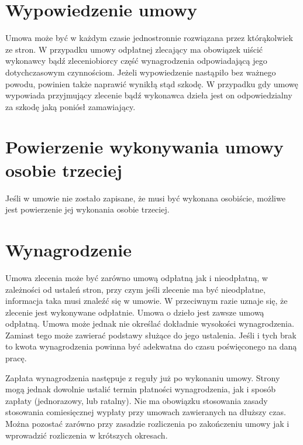 \section[Wypowiedzenie umowy][Wypowiedzenie umowy]{Wypowiedzenie umowy}
Umowa może być w każdym czasie jednostronnie rozwiązana przez którąkolwiek ze stron. W przypadku umowy odpłatnej zlecający ma obowiązek uiścić wykonawcy bądź zleceniobiorcy część wynagrodzenia odpowiadającą jego dotychczasowym czynnościom. Jeżeli wypowiedzenie nastąpiło bez ważnego powodu, powinien także naprawić wynikłą stąd szkodę. W przypadku gdy umowę wypowiada przyjmujący zlecenie bądź wykonawca dzieła jest on odpowiedzialny za szkodę jaką poniósł zamawiający.

\section[Powierzenie wykonywania umowy osobie trzeciej][Powierzenie wykonywania umowy osobie trzeciej]{Powierzenie wykonywania umowy osobie trzeciej}
Jeśli w umowie nie zostało zapisane, że musi być wykonana osobiście, możliwe jest powierzenie jej wykonania osobie trzeciej.

\section[Wynagrodzenie][Wynagrodzenie]{Wynagrodzenie}
Umowa zlecenia może być zarówno umową odpłatną jak i nieodpłatną, w zależności od ustaleń stron, przy czym jeśli zlecenie ma być nieodpłatne, informacja taka musi znaleźć się w umowie. W przeciwnym razie uznaje się, że zlecenie jest wykonywane odpłatnie. Umowa o dzieło jest zawsze umową odpłatną. Umowa może jednak nie określać dokładnie wysokości wynagrodzenia. Zamiast tego może zawierać podstawy służące do jego ustalenia. Jeśli i tych brak to kwota wynagrodzenia powinna być adekwatna do czasu poświęconego na daną pracę.

Zapłata wynagrodzenia następuje z reguły już po wykonaniu umowy. Strony mogą jednak dowolnie ustalić termin płatności wynagrodzenia, jak i sposób zapłaty (jednorazowy, lub ratalny). Nie ma obowiązku stosowania zasady stosowania comiesięcznej wypłaty przy umowach zawieranych na dłuższy czas. Można pozostać zarówno przy zasadzie rozliczenia po zakończeniu umowy jak i wprowadzić rozliczenia w krótszych okresach.

